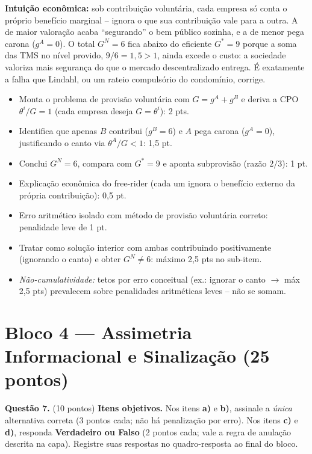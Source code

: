\begin{solucao}
\textbf{Intui\c{c}\~ao econ\^omica:} sob contribui\c{c}\~ao volunt\'aria, cada empresa s\'o conta o pr\'oprio benef\'icio marginal -- ignora o que sua contribui\c{c}\~ao vale para a outra. A de maior valora\c{c}\~ao acaba ``segurando'' o bem p\'ublico sozinha, e a de menor pega carona ($g^A=0$). O total $G^N=6$ fica abaixo do eficiente $G^*=9$ porque a soma das TMS no n\'ivel provido, $9/6 = 1{,}5 > 1$, ainda excede o custo: a sociedade valoriza mais seguran\c{c}a do que o mercado descentralizado entrega. \'E exatamente a falha que Lindahl, ou um rateio compuls\'orio do condom\'inio, corrige.
\rubricalabel
\begin{itemize}\item Monta o problema de provis\~ao volunt\'aria com $G = g^A + g^B$ e deriva a CPO $\theta^i/G = 1$ (cada empresa deseja $G = \theta^i$): 2 pts.\item Identifica que apenas $B$ contribui ($g^B = 6$) e $A$ pega carona ($g^A = 0$), justificando o canto via $\theta^A/G < 1$: 1{,}5 pt.\item Conclui $G^N = 6$, compara com $G^* = 9$ e aponta subprovis\~ao (raz\~ao $2/3$): 1 pt.\item Explica\c{c}\~ao econ\^omica do free-rider (cada um ignora o benef\'icio externo da pr\'opria contribui\c{c}\~ao): 0{,}5 pt.\item Erro aritm\'etico isolado com m\'etodo de provis\~ao volunt\'aria correto: penalidade leve de 1 pt.\item Tratar como solu\c{c}\~ao interior com ambas contribuindo positivamente (ignorando o canto) e obter $G^N \neq 6$: m\'aximo 2{,}5 pts no sub-item.\item \emph{N\~ao-cumulatividade:} tetos por erro conceitual (ex.: ignorar o canto $\to$ m\'ax 2{,}5 pts) prevalecem sobre penalidades aritm\'eticas leves -- n\~ao se somam.\end{itemize}
\end{solucao}


\clearpage
\section*{Bloco 4 --- Assimetria Informacional e Sinalização \hfill \normalsize (25 pontos)}

\textbf{Questão 7.} (10 pontos) \textbf{Itens objetivos.} Nos itens \textbf{a)} e \textbf{b)}, assinale a \emph{única} alternativa correta (3 pontos cada; não há penalização por erro). Nos itens \textbf{c)} e \textbf{d)}, responda \textbf{Verdadeiro ou Falso} (2 pontos cada; vale a regra de anulação descrita na capa). Registre suas respostas no quadro-resposta ao final do bloco.


